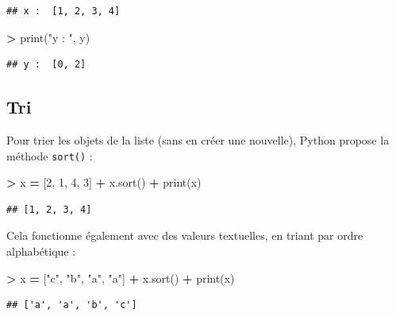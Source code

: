 \documentclass[12pt,]{book}
\newenvironment{Shaded}{\begin{snugshade}}{\end{snugshade}}
\newcommand{\DecValTok}[1]{\textcolor[rgb]{0.00,0.00,0.81}{#1}}
\newcommand{\StringTok}[1]{\textcolor[rgb]{0.31,0.60,0.02}{#1}}
\newcommand{\OperatorTok}[1]{\textcolor[rgb]{0.81,0.36,0.00}{\textbf{#1}}}
\newcommand{\BuiltInTok}[1]{#1}
\newcommand{\NormalTok}[1]{#1}
\numberwithin{equation}{section}
\numberwithin{countremarque}{section}
\begin{document}
\begin{lstlisting}
## x :  [1, 2, 3, 4]
\end{lstlisting}

\begin{Shaded}
\begin{Highlighting}[]
\OperatorTok{>} \BuiltInTok{print}\NormalTok{(}\StringTok{"y : "}\NormalTok{, y)}
\end{Highlighting}
\end{Shaded}

\begin{lstlisting}
## y :  [0, 2]
\end{lstlisting}

\subsection{Tri}\label{tri}

Pour trier les objets de la liste (sans en créer une nouvelle), Python
propose la méthode \texttt{sort()} :

\begin{Shaded}
\begin{Highlighting}[]
\OperatorTok{>}\NormalTok{ x }\OperatorTok{=}\NormalTok{ [}\DecValTok{2}\NormalTok{, }\DecValTok{1}\NormalTok{, }\DecValTok{4}\NormalTok{, }\DecValTok{3}\NormalTok{]}
\OperatorTok{+}\NormalTok{ x.sort()}
\OperatorTok{+} \BuiltInTok{print}\NormalTok{(x)}
\end{Highlighting}
\end{Shaded}

\begin{lstlisting}
## [1, 2, 3, 4]
\end{lstlisting}

Cela fonctionne également avec des valeurs textuelles, en triant par
ordre alphabétique :

\begin{Shaded}
\begin{Highlighting}[]
\OperatorTok{>}\NormalTok{ x }\OperatorTok{=}\NormalTok{ [}\StringTok{"c"}\NormalTok{, }\StringTok{"b"}\NormalTok{, }\StringTok{"a"}\NormalTok{, }\StringTok{"a"}\NormalTok{]}
\OperatorTok{+}\NormalTok{ x.sort()}
\OperatorTok{+} \BuiltInTok{print}\NormalTok{(x)}
\end{Highlighting}
\end{Shaded}

\begin{lstlisting}
## ['a', 'a', 'b', 'c']
\end{lstlisting}
\end{document}
